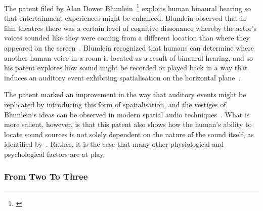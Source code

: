 The patent filed by Alan Dower Blumlein~\footnote{\citep{blumlein-patent}} exploits human binaural hearing so that entertainment experiences might be enhanced.
Blumlein observed that in film theatres there was a certain level of cognitive dissonance whereby the actor’s voices sounded like they were coming from a different location than where they appeared on the screen~\citep{alexander_blumlein}.
Blumlein recognized that humans can determine where another human voice in a room is located as a result of binaural hearing, and so his patent explores how sound might be recorded or played back in a way that induces an auditory event exhibiting spatialisation on the horizontal plane~\citep{blumlein-patent}.

The patent marked an improvement in the way that auditory events might be replicated by introducing this form of spatialisation, and the vestiges of Blumlein`s ideas can be observed in modern spatial audio techniques~\citep{politis_spatial, beyer_acoustics}.
What is more salient, however, is that this patent also shows how the human’s ability to locate sound sources is not solely dependent on the nature of the sound itself, as identified by~\citet{blauert_spatial}.
Rather, it is the case that many other physiological and psychological factors are at play.

\subsubsection{From Two To Three}

